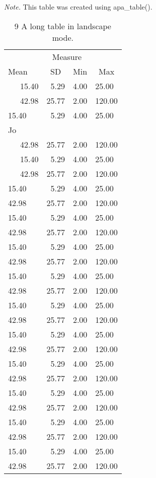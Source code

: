 \documentclass[man]{apa6}
\makeatletter
\newenvironment{lltable}{\begin{landscape}\begin{center}\begin{ThreePartTable}}{\end{ThreePartTable}\end{center}\end{landscape}}
\newcommand\LastLTentrywidth{1em}
\newlength\longtablewidth
\newcommand{\getlongtablewidth}{\begingroup \ifcsname LT@\roman{LT@tables}\endcsname \global\longtablewidth=0pt \renewcommand{\LT@entry}[2]{\global\advance\longtablewidth by ##2\relax\gdef\LastLTentrywidth{##2}}\@nameuse{LT@\roman{LT@tables}} \fi \endgroup}
\makeatother
\begin{document}
\begin{lltable}
\begin{TableNotes}[para]
\textit{Note.} This table was created using apa\_table().
\end{TableNotes}
\begin{longtable}{lrrl}\noalign{\getlongtablewidth\global\LTcapwidth=\longtablewidth}
\caption{\label{tab:unnamed-chunk-9}9 A long table in landscape mode.}\\
\toprule
 & \multicolumn{2}{c}{Measure}  &\\
\cmidrule(r){2-3}
Mean & \multicolumn{1}{c}{SD} & \multicolumn{1}{c}{Min} & \multicolumn{1}{c}{Max}\\
\midrule
\ \ \ 15.40 & 5.29 & 4.00 & 25.00\\
\ \ \ 42.98 & 25.77 & 2.00 & 120.00\\
15.40 & 5.29 & 4.00 & 25.00\\
Jo &  &  & \\ \midrule
\ \ \ 42.98 & 25.77 & 2.00 & 120.00\\
\ \ \ 15.40 & 5.29 & 4.00 & 25.00\\
\ \ \ 42.98 & 25.77 & 2.00 & 120.00\\
15.40 & 5.29 & 4.00 & 25.00\\
42.98 & 25.77 & 2.00 & 120.00\\
15.40 & 5.29 & 4.00 & 25.00\\
42.98 & 25.77 & 2.00 & 120.00\\
15.40 & 5.29 & 4.00 & 25.00\\
42.98 & 25.77 & 2.00 & 120.00\\
15.40 & 5.29 & 4.00 & 25.00\\
42.98 & 25.77 & 2.00 & 120.00\\
15.40 & 5.29 & 4.00 & 25.00\\
42.98 & 25.77 & 2.00 & 120.00\\
15.40 & 5.29 & 4.00 & 25.00\\
42.98 & 25.77 & 2.00 & 120.00\\
15.40 & 5.29 & 4.00 & 25.00\\
42.98 & 25.77 & 2.00 & 120.00\\
15.40 & 5.29 & 4.00 & 25.00\\
42.98 & 25.77 & 2.00 & 120.00\\
15.40 & 5.29 & 4.00 & 25.00\\
42.98 & 25.77 & 2.00 & 120.00\\
15.40 & 5.29 & 4.00 & 25.00\\
42.98 & 25.77 & 2.00 & 120.00\\

\end{longtable}
\end{lltable}
\end{document}
